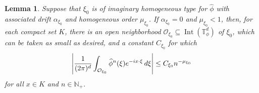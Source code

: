 \documentclass[11pt, letter]{book}
\newtheorem{lemma}[theorem]{Lemma}
\newcommand\Interior{\operatorname{Int}}
\newcommand{\f}[2]{\frac{#1}{#2}}
\begin{document}
\begin{framed}
\begin{lemma}\label{lem:EstImagHom}
Suppose that $\xi_0$ is of imaginary homogeneous type for $\widehat{\phi}$ with associated drift $\alpha_{\xi_0}$ and homogeneous order $\mu_{\xi_0}$. If $\alpha_{\xi_0}=0$ and $\mu_{\xi_0}<1$, then, for each compact set $K$, there is an open neighborhood $\mathcal{O}_{\xi_0}\subseteq\Interior(\mathbb{T}_\phi^d)$ of $\xi_0$, which can be taken as small as desired, and a constant $C_{\xi_0}$ for which
\begin{equation*}
    \abs{\f{1}{(2\pi)^d}\int_{\mathcal{O}_{\xi_0}}\widehat{\phi}^n(\xi)e^{-ix\cdot\xi}\,d\xi}\leq C_{\xi_0}n^{-\mu_{\xi_0}}
\end{equation*}
for all $x\in K$ and $n\in\mathbb{N}_+$.
\end{lemma}
\end{framed}
\end{document}
